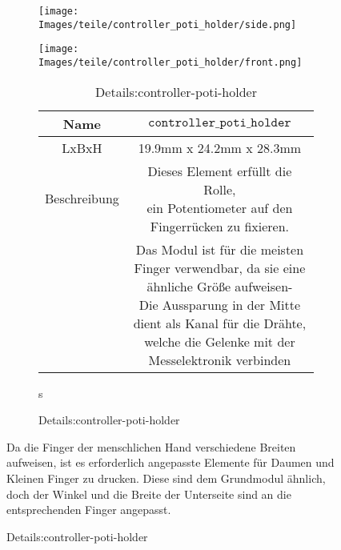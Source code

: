 
\begin{figure}[H]
    \begin{subfigure}[b]{0.5\textwidth}
            \texttt{[image: Images/teile/controller\_poti\_holder/side.png]}
            \centering
        
    \end{subfigure}
    \begin{subfigure}[b]{0.5\textwidth}
            \texttt{[image: Images/teile/controller\_poti\_holder/front.png]}
            \centering
    \end{subfigure}
    
    \begin{subfigure}[b]{0.6\textwidth}
        \begin{table}[H]
            \centering
            \begin{tabular}{|c|c|}
                \hline
                Name&$\texttt{controller}\_ \texttt{poti}\_ \texttt{holder}$\\
                \hline
                LxBxH&19.9mm x 24.2mm x 28.3mm\\
                \hline
                \vspace{3mm}
                Beschreibung&\shortstack{Dieses Element erfüllt die Rolle,\\ein Potentiometer auf den\\Fingerrücken zu fixieren.}\\
                &\shortstack{Das Modul ist für die meisten\\Finger verwendbar, da sie eine\\ähnliche Größe aufweisen-\\Die Aussparung in der Mitte\\dient als Kanal für die Drähte,\\welche die Gelenke mit der\\Messelektronik verbinden}\\
                \hline
            \end{tabular} 
            \caption{Details:controller-poti-holder}
            
        \end{table}s
        
    \end{subfigure}
    \begin{minipage}{0.4\textwidth}
        Da die Finger der menschlichen Hand verschiedene Breiten aufweisen, ist es erforderlich angepasste Elemente für 
        Daumen und Kleinen Finger zu drucken. Diese sind dem Grundmodul ähnlich, doch der Winkel und die Breite der Unterseite sind an die entsprechenden Finger angepasst. 
    \end{minipage}
\end{figure}



